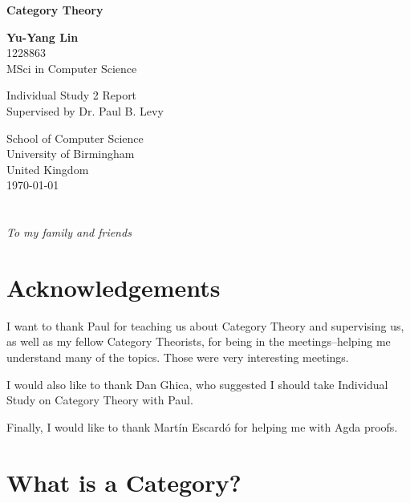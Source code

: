 \documentclass[11pt,twoside]{report}
\theoremstyle{definition}
\begin{document}
\begin{titlepage}
    \begin{center}
        \vspace*{1cm}

        \Huge
        \textbf{Category Theory}

        \vspace{0.5cm}
        \LARGE

        \vspace{1.5cm}

        \textbf{Yu-Yang Lin}\\
        1228863\\
        MSci in Computer Science

        \vfill

        Individual Study 2 Report\\
        Supervised by Dr. Paul B. Levy

        \vspace{0.8cm}

        \Large
        School of Computer Science\\
        University of Birmingham\\
        United Kingdom\\
        \today

    \end{center}
\end{titlepage}

\chapter*{}
\begin{center}\textit{To my family and friends}\end{center}

\chapter*{Acknowledgements}
I want to thank Paul for teaching us about Category Theory and supervising us, as well as my fellow Category Theorists, for being in the meetings--helping me understand many of the topics. Those were very interesting meetings.

I would also like to thank Dan Ghica, who suggested I should take Individual Study on Category Theory with Paul.

Finally, I would like to thank Martín Escardó for helping me with Agda proofs.
\tableofcontents

\chapter{What is a Category?}

\end{document}
